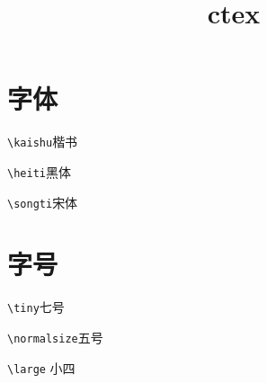 \documentclass[UTF8]{article}
\title{ctex}
\date{}
\begin{document}
\maketitle

\section{字体}
\kaishu \verb!\kaishu!楷书

\heiti \verb!\heiti!黑体

\songti \verb!\songti!宋体

\section{字号}
\tiny \verb!\tiny!七号

\normalsize \verb!\normalsize!五号

\large \verb!\large! 小四
\end{document}
